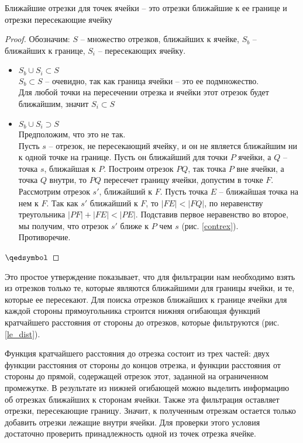 {\prop\label{cl_segs}
Ближайшие отрезки для точек ячейки -- это отрезки ближайшие к ее границе и отрезки пересекающие ячейку}
\begin{proof}
Обозначим: $S$ -- множество отрезков, ближайших к ячейке, $S_b$ -- ближайших к границе, $S_i$ --
пересекающих ячейку.
\begin{itemize}
\item $S_b \cup S_i \subset S$ \\
$S_b \subset S$ -- очевидно, так как граница ячейки -- это ее подмножество.\\
Для любой точки на пересечении отрезка и ячейки этот отрезок будет
ближайшим, значит $S_i \subset S$
\item $S_b \cup S_i \supset S$ \\
Предположим, что это не так.\\Пусть $s$ -- отрезок, не пересекающий
ячейку, и он не является ближайшим ни к одной точке на границе. Пусть
он ближайший для точки $P$ ячейки, а $Q$ -- точка $s$, ближайшая к $P$.
Построим отрезок $PQ$, так точка $P$ вне ячейки, а точка $Q$ внутри, то $PQ$
пересечет границу ячейки, допустим в точке $F$. Рассмотрим отрезок $s'$,
ближайший к $F$. Пусть точка $E$ -- ближайшая точка на нем к $F$.
Так как $s'$ ближайший к $F$, то $|FE| < |FQ|$, по неравенству треугольника $|PF|
+ |FE| < |PE|$. Подставив первое неравенство во второе, мы получим, что
отрезок $s'$ ближе к $P$ чем $s$ (рис. \ref{contrex}).\\
Противоречие.
\end{itemize}
$\qedsymbol$
\end{proof}

Это простое утверждение показывает, что для фильтрации нам
необходимо взять из отрезков только те, которые являются ближайшими для
границы ячейки, и те, которые ее пересекают.
Для поиска отрезков ближайших к границе ячейки для каждой стороны
прямоугольника строится нижняя огибающая функций кратчайшего расстояния от
стороны до отрезков, которые фильтруются (рис. \ref{le_dist}).

Функция кратчайшего расстояния до отрезка состоит из трех частей: двух функции расстояния от
стороны до концов отрезка, и функции расстояния от стороны до прямой,
содержащей отрезок этот, заданной на ограниченном промежутке. В результате
из нижней огибающей можно выделить информацию об отрезках ближайших к
сторонам ячейки. Также эта фильтрация оставляет отрезки, пересекающие
границу. Значит, к полученным отрезкам остается только добавить отрезки
лежащие внутри ячейки. Для проверки этого условия достаточно проверить
принадлежность одной из точек отрезка ячейке.

